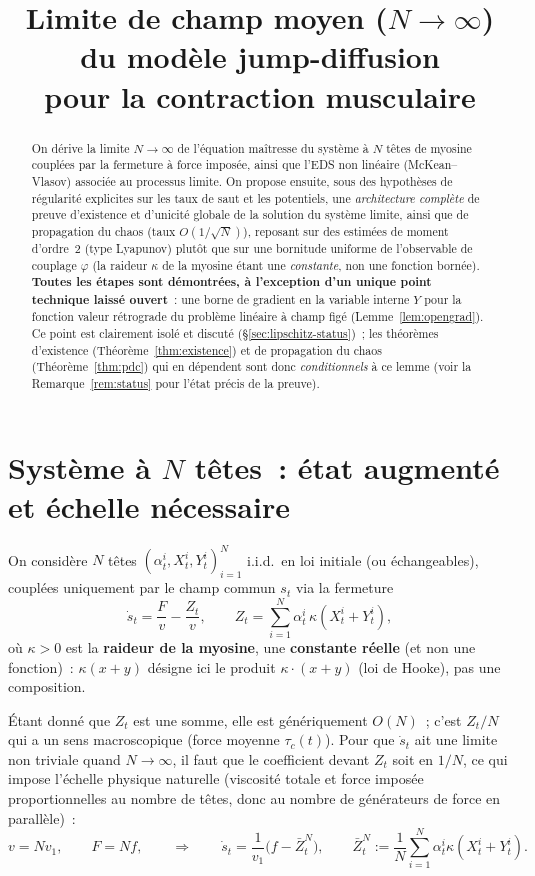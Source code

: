 \documentclass[11pt,a4paper]{article}
\title{Limite de champ moyen ($N\to\infty$) du mod\`ele jump-diffusion\\ pour la contraction musculaire}
\author{}
\date{}
\theoremstyle{plain}
\theoremstyle{definition}
\begin{document}
\maketitle

\begin{abstract}
On d\'erive la limite $N\to\infty$ de l'\'equation ma\^itresse du syst\`eme \`a $N$ t\^etes de myosine coupl\'ees par la fermeture \`a force impos\'ee, ainsi que l'EDS non lin\'eaire (McKean--Vlasov) associ\'ee au processus limite. On propose ensuite, sous des hypoth\`eses de r\'egularit\'e explicites sur les taux de saut et les potentiels, une \emph{architecture compl\`ete} de preuve d'existence et d'unicit\'e globale de la solution du syst\`eme limite, ainsi que de propagation du chaos (taux $O(1/\sqrt N)$), reposant sur des estim\'ees de moment d'ordre~2 (type Lyapunov) plut\^ot que sur une bornitude uniforme de l'observable de couplage $\varphi$ (la raideur $\kappa$ de la myosine \'etant une \emph{constante}, non une fonction born\'ee). \textbf{Toutes les \'etapes sont d\'emontr\'ees, \`a l'exception d'un unique point technique laiss\'e ouvert}~: une borne de gradient en la variable interne $Y$ pour la fonction valeur r\'etrograde du probl\`eme lin\'eaire \`a champ fig\'e (Lemme~\ref{lem:opengrad}). Ce point est clairement isol\'e et discut\'e (\S\ref{sec:lipschitz-status})~; les th\'eor\`emes d'existence (Th\'eor\`eme~\ref{thm:existence}) et de propagation du chaos (Th\'eor\`eme~\ref{thm:pdc}) qui en d\'ependent sont donc \emph{conditionnels} \`a ce lemme (voir la Remarque~\ref{rem:status} pour l'\'etat pr\'ecis de la preuve).
\end{abstract}

\section{Syst\`eme \`a $N$ t\^etes~: \'etat augment\'e et \'echelle n\'ecessaire}

On consid\`ere $N$ t\^etes $(\alpha_t^i, X_t^i, Y_t^i)_{i=1}^N$ i.i.d.\ en loi initiale (ou \'echangeables), coupl\'ees uniquement par le champ commun $s_t$ via la fermeture
\[
\dot s_t = \frac{F}{v} - \frac{Z_t}{v}, \qquad Z_t = \sum_{i=1}^N \alpha_t^i\,\kappa(X_t^i+Y_t^i),
\]
o\`u $\kappa>0$ est la \textbf{raideur de la myosine}, une \textbf{constante r\'eelle} (et non une fonction)~: $\kappa(x+y)$ d\'esigne ici le produit $\kappa\cdot(x+y)$ (loi de Hooke), pas une composition.

\'Etant donn\'e que $Z_t$ est une somme, elle est g\'en\'eriquement $O(N)$~; c'est $Z_t/N$ qui a un sens macroscopique (force moyenne $\tau_c(t)$). Pour que $\dot s_t$ ait une limite non triviale quand $N\to\infty$, il faut que le coefficient devant $Z_t$ soit en $1/N$, ce qui impose l'\'echelle physique naturelle (viscosit\'e totale et force impos\'ee proportionnelles au nombre de t\^etes, donc au nombre de g\'en\'erateurs de force en parall\`ele)~:
\[
v = N v_1, \qquad F = N f, \qquad \Longrightarrow \qquad \dot s_t = \frac{1}{v_1}\Big(f - \bar Z_t^N\Big), \qquad \bar Z_t^N := \frac1N\sum_{i=1}^N \alpha_t^i\kappa(X_t^i+Y_t^i).
\]
\end{document}
